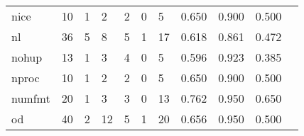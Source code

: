 \begin{longtable}{lp{1.2cm}p{1.2cm}p{1.2cm}p{1.2cm}p{1.2cm}p{1.2cm}p{1.2cm}p{1.2cm}p{1.2cm}p{1.2cm}}
nice      &                                    10 &                                                  1 &                                                  2 &                                                  2 &                                                  0 &                                                  5 &                                         0.650 &                                              0.900 &                                              0.500 \\
nl        &                                    36 &                                                  5 &                                                  8 &                                                  5 &                                                  1 &                                                 17 &                                         0.618 &                                              0.861 &                                              0.472 \\
nohup     &                                    13 &                                                  1 &                                                  3 &                                                  4 &                                                  0 &                                                  5 &                                         0.596 &                                              0.923 &                                              0.385 \\
nproc     &                                    10 &                                                  1 &                                                  2 &                                                  2 &                                                  0 &                                                  5 &                                         0.650 &                                              0.900 &                                              0.500 \\
numfmt    &                                    20 &                                                  1 &                                                  3 &                                                  3 &                                                  0 &                                                 13 &                                         0.762 &                                              0.950 &                                              0.650 \\
od        &                                    40 &                                                  2 &                                                 12 &                                                  5 &                                                  1 &                                                 20 &                                         0.656 &                                              0.950 &                                              0.500 \\

\end{longtable}
